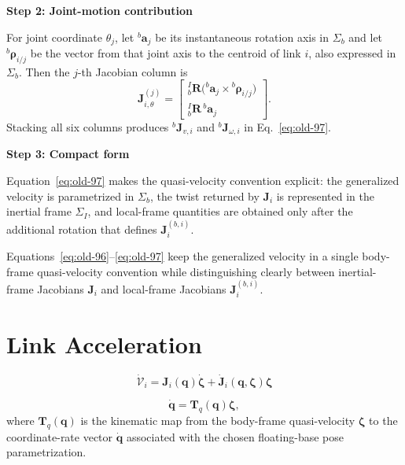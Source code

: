 \documentclass[12pt,a4paper]{report}
\newcommand{\formulaannotation}[1]{\par\noindent{}#1\par\vspace{0.35em}}
\newcommand{\Frame}[1]{\Sigma_{#1}}
\begin{document}
\textbf{Step 2: Joint-motion contribution}

For joint coordinate $\theta_j$, let ${}^{b}\mathbf{a}_j$ be its instantaneous rotation axis in $\Frame{b}$ and let ${}^{b}\boldsymbol{\rho}_{i/j}$ be the vector from that joint axis to the centroid of link $i$, also expressed in $\Frame{b}$. Then the $j$-th Jacobian column is
\begin{equation}
\mathbf{J}_{i,\theta}^{(j)}
=
\begin{bmatrix}
{}_{b}^{I}\mathbf{R}\bigl({}^{b}\mathbf{a}_j \times {}^{b}\boldsymbol{\rho}_{i/j}\bigr) \\
{}_{b}^{I}\mathbf{R}\,{}^{b}\mathbf{a}_j
\end{bmatrix}.
\end{equation}
Stacking all six columns produces ${}^{b}\mathbf{J}_{v,i}$ and ${}^{b}\mathbf{J}_{\omega,i}$ in Eq.~\eqref{eq:old-97}.

\textbf{Step 3: Compact form}

Equation~\eqref{eq:old-97} makes the quasi-velocity convention explicit: the generalized velocity is parametrized in $\Frame{b}$, the twist returned by $\mathbf{J}_i$ is represented in the inertial frame $\Frame{I}$, and local-frame quantities are obtained only after the additional rotation that defines $\mathbf{J}_i^{(b,i)}$.
\formulaannotation{Equations~\eqref{eq:old-96}--\eqref{eq:old-97} keep the generalized velocity in a single body-frame quasi-velocity convention while distinguishing clearly between inertial-frame Jacobians $\mathbf{J}_i$ and local-frame Jacobians $\mathbf{J}_i^{(b,i)}$.}

\section{Link Acceleration}

\begin{equation}
\dot{\mathcal{V}}_i = \mathbf{J}_i(\mathbf{q})\dot{\boldsymbol{\zeta}} + \dot{\mathbf{J}}_i(\mathbf{q},\boldsymbol{\zeta})\boldsymbol{\zeta}
\label{eq:old-98}
\end{equation}

\begin{equation}
\dot{\mathbf{q}} = \mathbf{T}_{q}(\mathbf{q})\boldsymbol{\zeta},
\label{eq:qdot-zeta-map}
\end{equation}
where $\mathbf{T}_{q}(\mathbf{q})$ is the kinematic map from the body-frame quasi-velocity $\boldsymbol{\zeta}$ to the coordinate-rate vector $\dot{\mathbf{q}}$ associated with the chosen floating-base pose parametrization.
\end{document}
